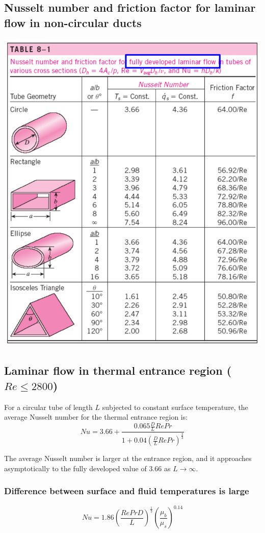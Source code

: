 \documentclass[11pt]{article}
\begin{document}
\subsection{Nusselt number and friction factor for laminar flow in non-circular ducts}
\label{sec:orgbcb492f}
\begin{center}
\includegraphics[width=.9\linewidth]{./images/laminar-flow-in-non-circular-ducts-table.png}
\end{center}

 \newpage
\subsection{Laminar flow in thermal entrance region (\(Re \le 2800\))}
\label{sec:org4006002}
For a circular tube of length \(L\) subjected to constant surface temperature, the average Nusselt number for the thermal entrance region is:
\[Nu = 3.66 + \frac{0.065 \frac{D}{L} Re Pr}{1 + 0.04 \left(\frac{D}{L} Re Pr \right)^{\frac{2}{3}}}\]

The average Nusselt number is larger at the entrance region, and it approaches asymptotically to the fully developed value of \(3.66\) as \(L \rightarrow \infty\).
\subsubsection{Difference between surface and fluid temperatures is large}
\label{sec:org2858fd4}
\[Nu = 1.86 \left(\frac{Re Pr D}{L} \right)^{\frac{1}{3}} \left(\frac{\mu_b}{\mu_s} \right)^{0.14}\]
\end{document}
